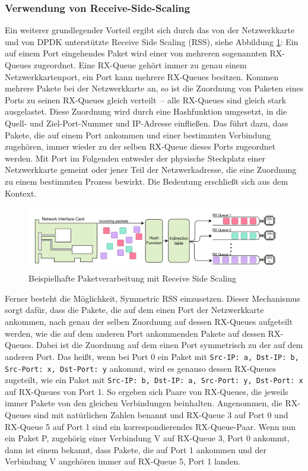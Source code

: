 \documentclass[../review_3.tex]{subfiles}
\begin{document}
\subsubsection{Verwendung von Receive-Side-Scaling}
Ein weiterer grundlegender Vorteil ergibt sich durch das von der Netzwerkkarte und von DPDK unterstützte Receive Side Scaling (RSS), siehe Abbildung \ref{fig:Receive-Side-Scaling}: Ein auf einem Port eingehendes Paket wird einer von mehreren sogenannten RX-Queues zugeordnet. Eine RX-Queue gehört immer zu genau einem Netzwerkkartenport, ein Port kann mehrere RX-Queues besitzen. Kommen mehrere Pakete bei der Netzwerkkarte an, so ist die Zuordnung von Paketen eines Ports zu seinen RX-Queues gleich verteilt~-- alle RX-Queues sind gleich stark ausgelastet. Diese Zuordnung wird durch eine Hashfunktion umgesetzt, in die Quell- und Ziel-Port-Nummer und IP-Adresse einfließen. Das führt dazu, dass Pakete, die auf einem Port ankommen und einer bestimmten Verbindung zugehören, immer wieder zu der selben RX-Queue dieses Ports zugeordnet werden. Mit \glqq Port\grqq{} im Folgenden entweder der physische Steckplatz einer Netzwerkkarte gemeint oder jener Teil der Netzwerkadresse, die eine Zuordnung zu einem bestimmten Prozess bewirkt. Die Bedeutung erschließt sich aus dem Kontext.

\begin{figure}[H]
    \centering
    \includegraphics[width=0.95\linewidth]{img/Receive-Side-Scaling.png}
    \caption{Beispielhafte Paketverarbeitung mit Receive Side Scaling}
    \label{fig:Receive-Side-Scaling}
\end{figure}

Ferner besteht die Möglichkeit, Symmetric RSS einzusetzen. Dieser Mechanismus sorgt dafür, dass die Pakete, die auf dem einen Port der Netzwerkkarte ankommen, nach genau der selben Zuordnung auf dessen RX-Queues aufgeteilt werden, wie die auf dem anderen Port ankommenden Pakete auf dessen RX-Queues. Dabei ist die Zuordnung auf dem einen Port \glqq symmetrisch\grqq{} zu der auf dem anderen Port. Das heißt, wenn bei Port 0 ein Paket mit \texttt{Src-IP: a, Dst-IP: b, Src-Port: x, Dst-Port: y} ankommt, wird es genauso dessen RX-Queues zugeteilt, wie ein Paket mit \texttt{Src-IP: b, Dst-IP: a, Src-Port: y, Dst-Port: x} auf RX-Queues von Port 1. So ergeben sich Paare von RX-Queues, die jeweils immer Pakete von den gleichen Verbindungen beinhalten. Angenommen, die RX-Queues sind mit natürlichen Zahlen benannt und RX-Queue 3 auf Port 0 und RX-Queue 5 auf Port 1 sind ein korrespondierendes RX-Queue-Paar. Wenn nun ein Paket P, zugehörig einer Verbindung V auf RX-Queue 3, Port 0 ankommt, dann ist einem bekannt, dass Pakete, die auf Port 1 ankommen und der Verbindung V angehören immer auf RX-Queue 5, Port 1 landen.
\end{document}
